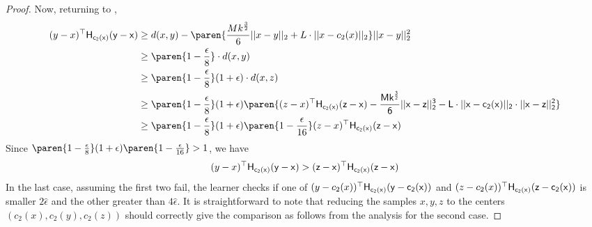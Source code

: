 \begin{proof}
    Now, returning to ,
    \begin{align}
        (y - x)^{\top}\sf{H}_{c_2(x)}(y - x) &\ge d(x,y) -\paren{\frac{M k^{\frac{3}{2}}}{6}||x - y||_2 + L\cdot ||x - c_2(x)||_2} ||x - y||_2^2 \\
        &\ge \paren{1 - \frac{\epsilon}{8}}\cdot d(x,y)\\
        &\ge \paren{1 - \frac{\epsilon}{8}} (1 + \epsilon)\cdot d(x,z)\\
        & \ge \paren{1 - \frac{\epsilon}{8}} (1 + \epsilon) \paren{(z - x)^{\top}\sf{H}_{c_2(x)}(z - x) - \frac{M k^{\frac{3}{2}}}{6}||x - z||_2^3 - L\cdot ||x - c_2(x)||_2\cdot ||x - z||_2^2}\\
        &\ge \paren{1 - \frac{\epsilon}{8}} (1 + \epsilon)\paren{1 - \frac{\epsilon}{16}} (z - x)^{\top}\sf{H}_{c_2(x)}(z - x)
    \end{align}
    Since $\paren{1 - \frac{\epsilon}{8}} (1 + \epsilon)\paren{1 - \frac{\epsilon}{16}} > 1$, we have 
    \begin{align*}
        (y - x)^{\top}\sf{H}_{c_2(x)}(y - x) > (z - x)^{\top}\sf{H}_{c_2(x)}(z - x)
    \end{align*}
    In the last case, assuming the first two fail, the learner checks if one of $(y - c_2(x))^{\top}\sf{H}_{c_2(x)}(y - c_2(x))$ and $(z - c_2(x))^{\top}\sf{H}_{c_2(x)}(z - c_2(x))$ is smaller $2 \hat{\epsilon}$ and the other greater than $4 \hat{\epsilon}$. It is straightforward to note that reducing the samples $x,y,z$ to the centers $(c_2(x),c_2(y),c_2(z))$ should correctly give the comparison as follows from the analysis for the second case.
\end{proof}
    

    \newpage
   